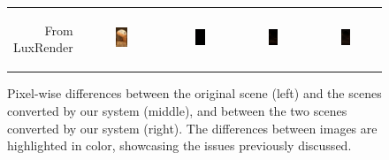 \begin{figure}[t!bp]
\begin{tabular}{@{}r@{ } c@{ } c@{ } c@{ } c }
		\begin{sideways} \parbox[b]{20mm} {\small{From\\ LuxRender}} \end{sideways} &
		\includegraphics[width=0.15\textwidth]{figs/4_results/staircase/1_from_lux.png} &
		\includegraphics[width=0.15\textwidth]{figs/4_results/staircase/diff_lux-mitsuba.png} &
		\includegraphics[width=0.15\textwidth]{figs/4_results/staircase/diff_lux-pbrt.png} &
		\includegraphics[width=0.15\textwidth]{figs/4_results/staircase/diff_mitsuba-pbrt.png}
	\end{tabular}
	\caption{Pixel-wise differences between the original scene (left) and the scenes converted by our system (middle), and between the two scenes converted by our system (right). The differences between images are highlighted in color, showcasing the issues previously discussed. }
	\label{fig:diffs}
\end{figure}

